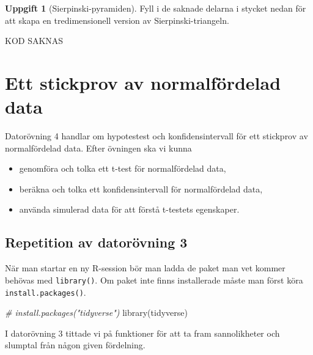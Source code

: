 \documentclass[
]{book}
\newenvironment{Shaded}{\begin{snugshade}}{\end{snugshade}}
\newcommand{\CommentTok}[1]{\textcolor[rgb]{0.56,0.35,0.01}{\textit{#1}}}
\newcommand{\FunctionTok}[1]{\textcolor[rgb]{0.00,0.00,0.00}{#1}}
\newcommand{\NormalTok}[1]{#1}
\theoremstyle{definition}
\theoremstyle{definition}
\theoremstyle{definition}
\newtheorem{exercise}{Uppgift}[chapter]
\theoremstyle{definition}
\theoremstyle{remark}
\begin{document}
\begin{exercise}[Sierpinski-pyramiden]

Fyll i de saknade delarna i stycket nedan för att skapa en tredimensionell version av Sierpinski-triangeln.

\begin{Shaded}
\begin{Highlighting}[]
\NormalTok{KOD SAKNAS}
\end{Highlighting}
\end{Shaded}

\end{exercise}

\hypertarget{ett-stickprov-av-normalfuxf6rdelad-data}{%
\chapter{Ett stickprov av normalfördelad data}\label{ett-stickprov-av-normalfuxf6rdelad-data}}

Datorövning 4 handlar om hypotestest och konfidensintervall för ett stickprov av normalfördelad data. Efter övningen ska vi kunna

\begin{itemize}
\item
  genomföra och tolka ett t-test för normalfördelad data,
\item
  beräkna och tolka ett konfidensintervall för normalfördelad data,
\item
  använda simulerad data för att förstå t-testets egenskaper.
\end{itemize}

\hypertarget{repetition-av-datoruxf6vning-3}{%
\section{Repetition av datorövning 3}\label{repetition-av-datoruxf6vning-3}}

När man startar en ny R-session bör man ladda de paket man vet kommer behövas med \texttt{library()}. Om paket inte finns installerade måste man först köra \texttt{install.packages()}.

\begin{Shaded}
\begin{Highlighting}[]
\CommentTok{\# install.packages("tidyverse")}
\FunctionTok{library}\NormalTok{(tidyverse)}
\end{Highlighting}
\end{Shaded}

I datorövning 3 tittade vi på funktioner för att ta fram sannolikheter och slumptal från någon given fördelning.
\end{document}
